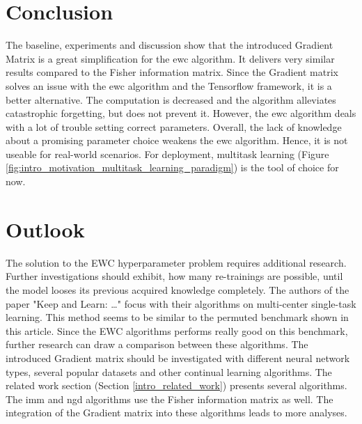 \section{Conclusion}

The baseline, experiments and discussion show that the introduced Gradient Matrix is a great simplification for the \acrshort{ewc} algorithm.
It delivers very similar results compared to the Fisher information matrix.
Since the Gradient matrix solves an issue with the \acrshort{ewc} algorithm and the Tensorflow framework, it is a better alternative.
The computation is decreased and the algorithm alleviates catastrophic forgetting, but does not prevent it.
However, the \acrshort{ewc} algorithm deals with a lot of trouble setting correct parameters.
Overall, the lack of knowledge about a promising parameter choice weakens the \acrshort{ewc} algorithm.
Hence, it is not useable for real-world scenarios.
For deployment, multitask learning (Figure \ref{fig:intro_motivation_multitask_learning_paradigm}) is the tool of choice for now.

\section{Outlook}

The solution to the EWC hyperparameter problem requires additional research.
Further investigations should exhibit, how many re-trainings are possible, until the model looses its previous acquired knowledge completely.
\newline
The authors of the paper "Keep and Learn: …" \cite{Keep_and_Learn} focus with their algorithms on multi-center single-task learning.
This method seems to be similar to the permuted benchmark shown in this article.
Since the EWC algorithms performs really good on this benchmark, further research can draw a comparison between these algorithms.
\newline
The introduced Gradient matrix should be investigated with different neural network types, several popular datasets and other continual learning algorithms.
The related work section (Section \ref{intro_related_work}) presents several algorithms.
The \acrshort{imm} and \acrshort{ngd} algorithms use the Fisher information matrix as well.
The integration of the Gradient matrix into these algorithms leads to more analyses.
